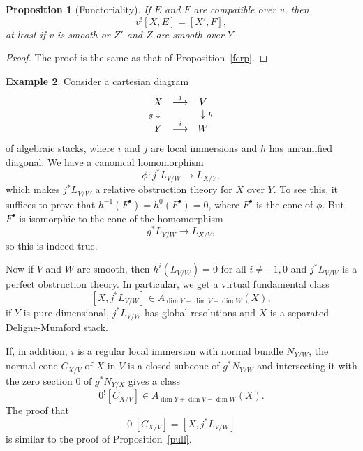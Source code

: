 \documentclass[11pt]{article}
\theoremstyle{plain}
\newtheorem{prop}{Proposition}[section]
\theoremstyle{definition}
\newtheorem{numexp}[prop]{Example}
\newenvironment{numex}{\begin{numexp}\normalfont}{\end{numexp}}
\newenvironment{pf}{\begin{proof}}{\end{proof}}
\newcommand{\upst}{^{\ast}}
\newcommand{\upsh}{^{!}}
\newcommand{\com}{^{\scriptscriptstyle\bullet}}
\newcommand{\ldiag}[1]
       {\makebox[0cm]{\({\scriptstyle#1}\downarrow\phantom{\scriptstyle#1}\)}}
\newcommand{\rdiag}[1]
       {\makebox[0cm]{\(\phantom{\scriptstyle#1}\downarrow{\scriptstyle#1}\)}}
\newcommand{\comdia}[9]{
\begin{array}{ccc}
#1 & \stackrel{#2}{\longrightarrow} & #3 \\
\ldiag{#4} & #5 & \rdiag{#6} \\
#7 & \stackrel{#8}{\longrightarrow} & #9
\end{array}}
\theoremstyle{plain}
\theoremstyle{definition}
\theoremstyle{remark}
\begin{document}
\begin{prop}[Functoriality]\label{rvofp}
If \(E\) and \(F\) are compatible over \(v\), then
\[
v\upsh[X,E]=[X',F],
\]
at least if \(v\) is smooth or \(Z'\) and \(Z\) are smooth over \(Y\).
\end{prop}
\begin{pf}
The proof is the same as that of Proposition~\ref{fcrp}.
\end{pf}

\begin{numex} \label{rfe}
Consider a cartesian diagram
\[
\comdia{X}{j}{V}{g}{}{h}{Y}{i}{W}
\]
of algebraic stacks, where \(i\) and \(j\) are local immersions and \(h\)
has unramified diagonal. We have a canonical homomorphism
\[
\phi:j\upst L_{V/W}\longrightarrow L_{X/Y},
\]
which makes \(j\upst L_{V/W}\) a relative obstruction theory for \(X\)
over \(Y\). To see this, it suffices to prove that
\(h^{-1}(F\com)=h^0(F\com)=0\), where \(F\com\) is the cone of \(\phi\). But
\(F\com\) is isomorphic to the cone of the homomorphism
\[
g\upst L_{Y/W}\longrightarrow L_{X/V},
\]
so this is indeed true.

Now if \(V\) and \(W\) are smooth, then \(h^i(L_{V/W})=0\) for all
\(i\not=-1,0\) and \(j\upst L_{V/W}\) is a perfect obstruction theory. In
particular, we get a virtual fundamental class
\[
[X,j\upst L_{V/W}]\in A_{\dim Y+\dim V-\dim W}(X),
\]
if \(Y\) is pure dimensional, \(j\upst L_{V/W}\) has global resolutions
and \(X\) is a separated Deligne-Mumford stack.

If, in addition, \(i\) is a regular local immersion with normal bundle
\(N_{Y/W}\), the normal cone \(C_{X/V}\) of \(X\) in \(V\) is a closed subcone
of \(g\upst N_{Y/W}\) and intersecting it with the zero section \(0\) of
\(g\upst N_{Y/X}\) gives a class
\[
0\upsh[C_{X/V}]\in A_{\dim Y+\dim V-\dim W}(X).
\]
The proof that
\[
0\upsh[C_{X/V}]=[X,j\upst L_{V/W}]
\]
is similar to the proof of Proposition~\ref{pull}.
\end{numex}










%
%
\end{document}
